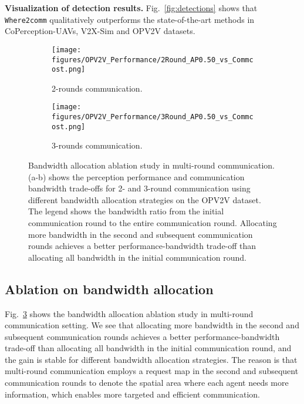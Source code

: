 \documentclass{article}
\begin{document}
\textbf{Visualization of detection results.} Fig.~\ref{fig:detections} shows that \texttt{Where2comm} qualitatively outperforms the state-of-the-art methods in CoPerception-UAVs, V2X-Sim and OPV2V datasets. 












\begin{figure}[!t]
    \centering
    \centering
  \begin{subfigure}{0.45\linewidth}
    \texttt{[image: figures/OPV2V\_Performance/2Round\_AP0.50\_vs\_Commcost.png]}
\caption{2-rounds communication.}
    \label{fig:UAV_Image}
  \end{subfigure}
\begin{subfigure}{0.45\linewidth}
    \texttt{[image: figures/OPV2V\_Performance/3Round\_AP0.50\_vs\_Commcost.png]}
\caption{3-rounds communication. }
    \label{fig:UAV_ConfMap}
  \end{subfigure}
    \caption{Bandwidth allocation ablation study in multi-round communication. (a-b) shows the perception performance and communication bandwidth trade-offs for 2- and 3-round communication using different bandwidth allocation strategies on the OPV2V dataset. The legend shows the bandwidth ratio from the initial communication round to the entire communication round. Allocating more bandwidth in the second and subsequent communication rounds achieves a better performance-bandwidth trade-off than allocating all bandwidth in the initial communication round.}
    \label{fig:bandwidth_allocation}
\end{figure}


\subsection{Ablation on bandwidth allocation}
Fig.~\ref{fig:bandwidth_allocation} shows the bandwidth allocation ablation study in multi-round communication setting. We see that allocating more bandwidth in the second and subsequent communication rounds achieves a better performance-bandwidth trade-off than allocating all bandwidth in the initial communication round, and the gain is stable for different bandwidth allocation strategies. The reason is that multi-round communication employs a request map in the second and subsequent communication rounds to denote the spatial area where each agent needs more information, which enables more targeted and efficient communication. 
\end{document}
